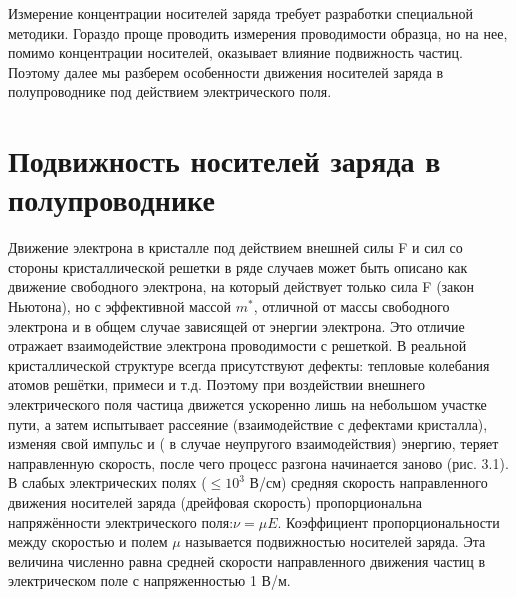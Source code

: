 Измерение концентрации носителей заряда требует разработки специальной методики. Гораздо проще проводить измерения
проводимости образца, но на нее, помимо концентрации носителей, оказывает влияние подвижность частиц. Поэтому далее мы
разберем особенности движения носителей заряда в полупроводнике под действием электрического поля. 


\section{Подвижность носителей заряда в полупроводнике}

Движение электрона в кристалле под действием внешней силы F и сил со стороны кристаллической решетки в ряде случаев
может быть описано как движение свободного электрона, на который действует только сила F (закон Ньютона), но с
эффективной массой $m^*$, отличной от массы свободного электрона и в общем случае зависящей от энергии электрона. Это
отличие отражает взаимодействие электрона проводимости с решеткой. 
В реальной кристаллической структуре всегда присутствуют дефекты: тепловые колебания атомов решётки, примеси и т.д.
Поэтому при воздействии внешнего электрического поля частица движется ускоренно лишь на небольшом участке пути, а затем
испытывает рассеяние (взаимодействие с дефектами кристалла), изменяя свой импульс и ( в случае неупругого
взаимодействия) энергию, теряет направленную скорость, после чего процесс разгона начинается заново (рис. 3.1). В слабых
электрических полях ($\leq 10^3$ В/см) средняя скорость направленного движения носителей заряда (дрейфовая скорость)
пропорциональна напряжённости электрического поля:$\nu = \mu E$. Коэффициент пропорциональности между скоростью и полем $\mu$
называется подвижностью носителей заряда. Эта величина численно равна средней скорости направленного движения частиц в
электрическом поле с напряженностью 1 В/м. 

